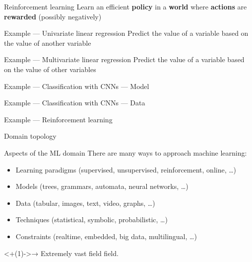 \begin{frame}{Reinforcement learning}
  Learn an efficient \textbf{policy} in a \textbf{world} where \textbf{actions} are \textbf{rewarded} (possibly negatively)
  \vfill
  \begin{minipage}[l]{0.39\linewidth}
  \end{minipage}
  \begin{minipage}[l]{0.59\linewidth}
  \end{minipage}
\end{frame}

\begin{frame}{Example --- Univariate linear regression}
  Predict the value of a variable based on the value of another variable

\end{frame}

\begin{frame}{Example --- Multivariate linear regression}
  Predict the value of a variable based on the value of other variables

\end{frame}

\begin{frame}{Example --- Classification with CNNs --- Model}
\end{frame}

\begin{frame}{Example --- Classification with CNNs --- Data}
\end{frame}

\begin{frame}{Example --- Reinforcement learning}
\end{frame}

\begin{frame}{Domain topology}
\end{frame}

\begin{frame}{Aspects of the ML domain}
  There are many ways to approach machine learning:
  \begin{itemize}[<+(1)->]
  \item Learning paradigms (supervised, unsupervised, reinforcement, online, …)
  \item Models (trees, grammars, automata, neural networks, …)
  \item Data (tabular, images, text, video, graphs, …)
  \item Techniques (statistical, symbolic, probabilistic, …)
  \item Constraints (realtime, embedded, big data, multilingual, …)
  \end{itemize}

  \onslide<+(1)->{→ Extremely vast field field.}
\end{frame}

